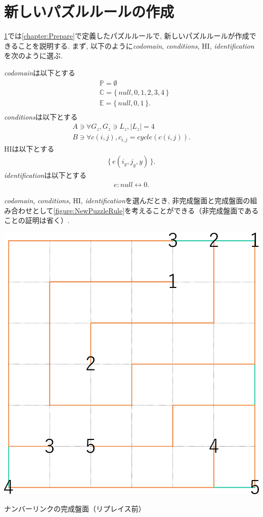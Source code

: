 \section{新しいパズルルールの作成}\label{section:NewPuzzleRule}
\cref{section:NewPuzzleRule}では\cref{chapter:Prepare}で定義したパズルルールで, 新しいパズルルールが作成できることを説明する. まず, 以下のように\textit{codomain}, \textit{conditions}, HI, \textit{identification}を次のように選ぶ.

\textit{codomain}は以下とする
\begin{align}
   & \mathbb{P}=\emptyset                       \\
   & \mathbb{C}=\{\,\textit{null},0,1,2,3,4\,\} \\
   & \mathbb{E}=\{\,\textit{null},0,1\,\}  .    \\
\end{align}
\textit{conditions}は以下とする
\begin{align}
  A\ni \forall G_z, G_z\ni L_z, |L_z|=4 \\
  B\ni \forall c(i,j), c_{i,j}= cycle(c(i,j)).
\end{align}
HIは以下とする
\begin{align}
  \{\,e(i_y,j_y,y)\,\}.
\end{align}
\textit{identification}は以下とする
\begin{align}
  e:\textit{null}\leftrightarrow 0.
\end{align}

\textit{codomain}, \textit{conditions}, HI, \textit{identification}を選んだとき, 非完成盤面と完成盤面の組み合わせとして\cref{figure:NewPuzzleRule}を考えることができる（非完成盤面であることの証明は省く）.

\begin{clearpagefigure}
  \includegraphics[width=0.85\linewidth,clip]{fig/NumberLink.eps}
  \caption{ナンバーリンクの完成盤面（リプレイス前）}
  \label{figure:NumberLink}
\end{clearpagefigure}

